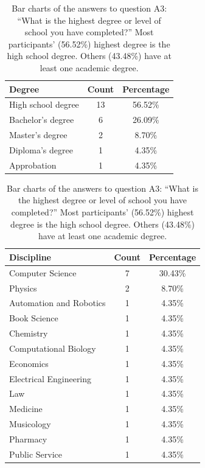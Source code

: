 \begin{table}[H]
	\centering
	\begin{subtable}{.5\linewidth}
		\footnotesize
		\centering
		\begin{tabular}{l c c}
			\toprule
			Degree             & Count & Percentage \\
			\midrule
			High school degree & 13    & 56.52\%    \\
			Bachelor's degree  & 6     & 26.09\%    \\
			Master's degree    & 2     & 8.70\%     \\
			Diploma's degree   & 1     & 4.35\%     \\
			Approbation        & 1     & 4.35\%     \\
			\bottomrule
		\end{tabular}
		\caption{Bar charts of the answers to question A3: \enquote{What is the highest degree or level of school you have completed?} Most participants' (56.52\%) highest degree is the high school degree. Others (43.48\%) have at least one academic degree.}\label{tab:sus-degree}
	\end{subtable}%
	\begin{subtable}{.5\linewidth}
		\footnotesize
		\centering
		\begin{tabular}{l c c}
			\toprule
			Discipline              & Count & Percentage \\
			\midrule
			Computer Science        & 7     & 30.43\%    \\
			Physics                 & 2     & 8.70\%     \\
			Automation and Robotics & 1     & 4.35\%     \\
			Book Science            & 1     & 4.35\%     \\
			Chemistry               & 1     & 4.35\%     \\
			Computational Biology   & 1     & 4.35\%     \\
			Economics               & 1     & 4.35\%     \\
			Electrical Engineering  & 1     & 4.35\%     \\
			Law                     & 1     & 4.35\%     \\
			Medicine                & 1     & 4.35\%     \\
			Musicology              & 1     & 4.35\%     \\
			Pharmacy                & 1     & 4.35\%     \\
			Public Service          & 1     & 4.35\%     \\

\end{tabular}
\end{subtable}
\end{table}
